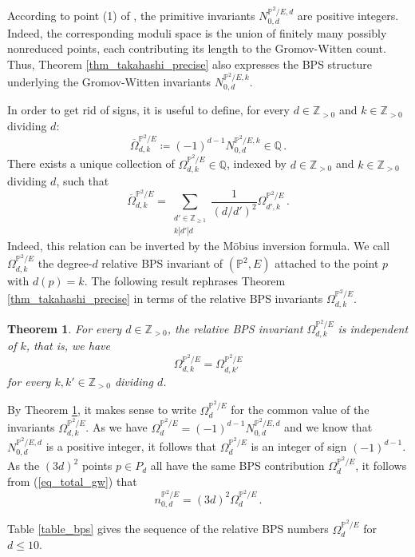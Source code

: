 \documentclass[11pt,letterpaper]{amsart}
\newtheorem{thm}[defn]{Theorem}
\newcommand\PP{\mathbb P}
\newcommand\Q{\mathbb Q}
\newcommand\Z{\mathbb Z}
\begin{document}
According to point (1) of 
\cite[Proposition 4.21]{choi2018log}, the primitive invariants $N_{0,d}^{\PP^2/E,d}$
are positive integers. Indeed, the corresponding moduli space is the union of finitely many possibly nonreduced points, 
each contributing its length to the Gromov-Witten count. Thus, Theorem \ref{thm_takahashi_precise} also expresses the BPS structure underlying the Gromov-Witten invariants $N_{0,d}^{\PP^2/E,k}$.


In order to get rid of signs, it is useful to define, for every 
$d \in \Z_{>0}$ and $k \in \Z_{>0}$ dividing $d$:
\[\overline{\Omega}_{d, k}^{\PP^2/E} \coloneq (-1)^{d-1}
N_{0,d}^{\PP^2/E, k} \in \Q\,.\]
There exists a unique collection of $\Omega^{\PP^2/E}_{d,k} \in \Q$, indexed by $d \in \Z_{>0}$ and $k \in \Z_{>0}$ dividing $d$, such that
\begin{equation}\label{equation_bps}
\overline{\Omega}_{d, k}^{\PP^2/E}=\sum_{\substack{d' \in \Z_{\geqslant 1}\\ k|d'|d}} \frac{1}{(d/d')^2} \Omega^{\PP^2/E}_{d', k}\,.\end{equation}
Indeed, this relation can be inverted by the M\"obius inversion formula. We call $\Omega_{d,k}^{\PP^2/E}$
the degree-$d$ relative BPS invariant of 
$(\PP^2,E)$ attached to the point $p$
with $d(p)=k$.
The following result
rephrases Theorem \ref{thm_takahashi_precise}
in terms of the relative BPS invariants 
$\Omega_{d,k}^{\PP^2/E}$.

\begin{thm}\label{thm_takahashi_bps}
For every $d \in \Z_{>0}$, the relative 
BPS invariant $\Omega_{d,k}^{\PP^2/E}$ is independent of $k$, 
that is, we have
\[ \Omega_{d,k}^{\PP^2/E}=\Omega_{d,k'}^{\PP^2/E}\]
for every $k, k' \in \Z_{>0}$ dividing $d$.
\end{thm}


By Theorem \ref{thm_takahashi_bps}, it makes sense to write
$\Omega_d^{\PP^2/E}$ for the common value of the invariants
$\Omega_{d,k}^{\PP^2/E}$. As we have $\Omega_d^{\PP^2/E}=(-1)^{d-1} N_{0,d}^{\PP^2/E,d}$ and we know that $N_{0,d}^{\PP^2/E,d}$ is a positive integer, it follows that $\Omega_d^{\PP^2/E}$ is an integer of sign $(-1)^{d-1}$. As the $(3d)^2$ points $p \in P_d$ all have the same BPS contribution
$\Omega_d^{\PP^2/E}$, it follows from (\ref{eq_total_gw}) that  
\begin{equation} n_{0,d}^{\PP^2/E}=(3d)^2 \Omega_d^{\PP^2/E}\,.\end{equation}

Table \ref{table_bps} gives the sequence of the relative BPS numbers
$\Omega_d^{\PP^2/E}$ for $d \leqslant 10$.
\end{document}
